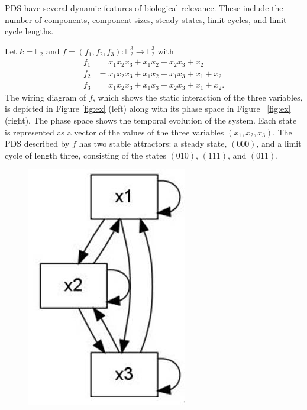 \documentclass[10pt]{bmc_article}
\newenvironment{bmcformat}{\begin{raggedright}\baselineskip20pt\sloppy\setboolean{publ}{false}}{\end{raggedright}\baselineskip20pt\sloppy}
\newcommand{\comment}[1]{}
\begin{document}
\begin{bmcformat}
\comment{PDS are special cases of finite
dynamical systems, which are maps $X^n \rightarrow   X^n$ over arbitrary
finite sets $X$.}
PDS have several dynamic features of biological
relevance. These include the number of components, component sizes, steady states, limit cycles, and limit cycle lengths.
\begin{example}
Let $k= \mathbb F_2$ and $f = (f_1, f_2, f_3) : \mathbb F_2^3 \rightarrow
\mathbb F_2^3$ with
\begin{align*}
f_1 &= x_1x_2x_3+x_1x_2+x_2x_3+x_2 \\
f_2 &= x_1x_2x_3+x_1x_2+x_1x_3+x_1+x_2 \\
f_3 &= x_1x_2x_3+x_1x_3+x_2x_3+x_1+x_2.
\end{align*}
The wiring diagram of $f$, which shows the static interaction of the three
variables, is
depicted in Figure \ref{fig:ex} (left) along with its phase space in Figure
~\ref{fig:ex} (right).
The phase space shows the temporal evolution of the system. Each state is
represented as a vector of the values of the three variables $(x_1, x_2,
x_3)$.
The PDS described by $f$ has
two stable attractors: a steady state, $(000)$, and a limit cycle of length
three, consisting of the states $(010)$, $(111)$, and $(011)$.
\end{example}
\begin{figure}[ht]
\centering
\includegraphics[scale=0.55]{exampleWD.jpg}

\end{figure}
\end{bmcformat}
\end{document}
